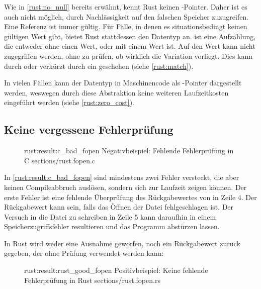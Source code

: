 Wie in \autoref{rust:no_null} bereits erwähnt, kennt Rust keinen -Pointer.
Daher ist es auch nicht möglich, durch Nachlässigkeit auf den falschen Speicher zuzugreifen.
Eine Referenz ist immer gültig.
Für Fälle, in denen es situationsbedingt keinen gültigen Wert gibt, bietet Rust stattdessen den  Datentyp an.
 ist eine Aufzählung, die entweder  ohne einen Wert, oder  mit einem Wert ist.
Auf den Wert kann nicht zugegriffen werden, ohne zu prüfen, ob wirklich die Variation  vorliegt.
Dies kann durch  oder verkürzt durch ein  geschehen (siehe \autoref{rust:match}).

In vielen Fällen kann der  Datentyp in Maschinencode als -Pointer dargestellt werden, weswegen durch diese Abstraktion keine weiteren Laufzeitkosten eingeführt werden \cite[100]{rust:orly_programming} (siehe \autoref{rust:zero_cost}).

\subsection{Keine vergessene Fehlerprüfung}
\label{rust:result}

\begin{figure}[H]
	\ccinclude
	{rust:result:c_bad_fopen}
	{Negativbeispiel: Fehlende Fehlerprüfung in C}
	{sections/rust.fopen.c}
\end{figure}

In \autoref{rust:result:c_bad_fopen} sind mindestens zwei Fehler versteckt, die aber keinen Compileabbruch auslösen, sondern sich zur Laufzeit zeigen können.
Der erste Fehler ist eine fehlende Überprüfung des Rückgabewertes von  in Zeile 4.
Der Rückgabewert kann  sein, falls das Öffnen der Datei fehlgeschlagen ist.
Der Versuch in die Datei zu schreiben in Zeile 5 kann daraufhin in einem Speicherzugriffsfehler resultieren und das Programm abstürzen lassen.

In Rust wird weder eine Ausnahme geworfen, noch ein Rückgabewert zurück gegeben, der ohne Prüfung verwendet werden kann:

\begin{figure}[H]
	\rustcinclude
		{rust:result:rust_good_fopen}
		{Positivbeispiel: Keine fehlende Fehlerprüfung in Rust}
		{sections/rust.fopen.rs}
\end{figure}

